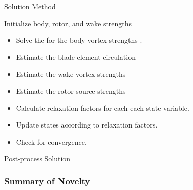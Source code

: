 \begin{algorithm}
\caption{Solution Method}\label{alg:csor}
\label{alg:solver}
\begin{algorithmic}
\State Initialize body, rotor, and wake strengths
\begin{itemize}
        \renewcommand\labelitemi{\(\cdot\)}
        \setlength{\itemindent}{1em}
        \item Solve the for the body vortex strengths .
        \item Estimate the blade element circulation 
        \item Estimate the wake vortex strengths 
        \item Estimate the rotor source strengths 
        \item Calculate relaxation factors for each each state variable. %
        \item Update states according to relaxation factors. %
        \item Check for convergence. %
        \end{itemize}
\EndWhile
\State Post-process Solution
\end{algorithmic}
\end{algorithm}


\subsubsection{Summary of Novelty}

